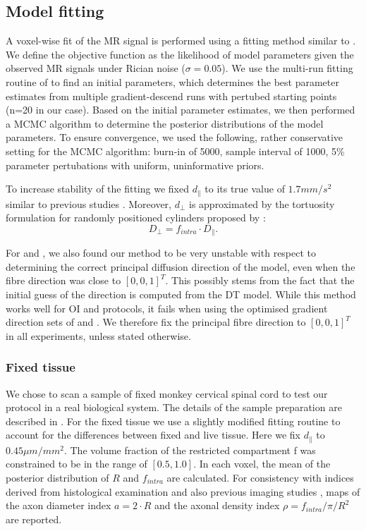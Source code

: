 \subsection{Model fitting}
A voxel-wise fit of the MR signal is performed using a fitting method similar to \citet{Alexander:2010}. We define the objective function as the likelihood of model parameters given the observed MR signals under Rician noise ($\sigma=0.05$). We use the multi-run fitting routine of \citet{Panagiotaki:2012} to find an initial parameters, which determines the best parameter estimates from multiple gradient-descend runs with pertubed starting points (n=20 in our case). Based on the initial parameter estimates, we then performed a \gls{MCMC} algorithm to determine the posterior distributions of the model parameters. To ensure convergence, we used the following, rather conservative setting for the \gls{MCMC} algorithm: burn-in of 5000, sample interval of 1000, 5\% parameter pertubations with uniform, uninformative priors.

To increase stability of the fitting we fixed $d_\parallel$ to its true value of $1.7mm/s^2$ similar to previous studies \citep{Assaf:2008,Barazany:2009,Alexander:2010}. Moreover, $d_\bot$ is approximated by the tortuosity formulation for randomly positioned cylinders proposed by \citet{Szafer:1995}:
\begin{equation}
    D_{\bot} = f_{intra}\cdot D_{\parallel}.
\end{equation}


For {\DO} and {\FD}, we also found our method to be very unstable with respect to determining the correct principal diffusion direction of the model, even when the fibre direction was close to $[0,0,1]^T$. This possibly stems from the fact that the initial guess of the direction is computed from the \gls{DT} model. While this method works well for {\gls{OI}} and {\SD} protocols, it fails when using the optimised gradient direction sets of {\DO} and {\FD}. We therefore fix the principal fibre direction to $[0,0,1]^T$ in all experiments, unless stated otherwise.

\subsubsection{Fixed tissue}
We chose to scan a sample of fixed monkey cervical spinal cord to test our protocol in a real biological system. The details of the sample preparation are described in \citep{Lundell:2011}. For the fixed tissue we use a slightly modified fitting routine to account for the differences between fixed and live tissue. Here we fix $d_{\|}$ to $0.45\mu m/mm^2$. The volume fraction of the restricted compartment f was constrained to be in the range of $[0.5, 1.0]$. In each voxel, the mean of the posterior distribution of $R$ and $f_{intra}$ are calculated. For consistency with indices derived from histological examination \citep{Keyserlingk:1984,LaMantia:1990a,Aboitiz:1992} and also previous imaging studies \citep{Alexander:2010}, maps of the axon diameter index $a=2\cdot R$ and the axonal density index $\rho=f_{intra}/\pi/R^2$ are reported.

